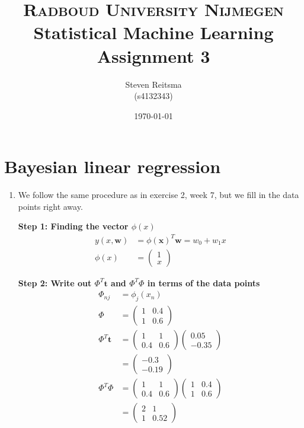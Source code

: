 \documentclass[paper=a4, fontsize=10pt]{scrartcl} %
\title{	
\normalfont \normalsize 
\textsc{Radboud University Nijmegen}  %
\horrule{0.5pt} \\[0.3cm] %
\huge Statistical Machine Learning \\ Assignment 3 \\ %
\horrule{2pt}  %
}
\author{Steven Reitsma \\ (s4132343)} %
\date{\normalsize\today} %
\numberwithin{equation}{section} %
\numberwithin{figure}{section} %
\numberwithin{table}{section} %
\begin{document}
\maketitle %

\section{Bayesian linear regression}
\begin{enumerate}
	\item   We follow the same procedure as in exercise 2, week 7, but we fill in the data points right away.

			\textbf{Step 1: Finding the vector $\phi(x)$}
			\begin{align}
				y(x, \boldsymbol w) &= \phi(\boldsymbol x)^T\boldsymbol w = w_0 + w_1x\\
				\phi(x) &= \begin{pmatrix}
								1\\
								x
							\end{pmatrix}
			\end{align}

			\textbf{Step 2: Write out $\Phi^T\boldsymbol t$ and $\Phi^T\Phi$ in terms of the data points}
			\begin{align}
				\Phi_{nj} &= \phi_j(x_n)\\
				\Phi &= \begin{pmatrix}
							1 & 0.4 \\
							1 & 0.6
						\end{pmatrix}\\
				\Phi^T \boldsymbol t &= \begin{pmatrix}
											1 & 1\\
											0.4 & 0.6
										\end{pmatrix}
										\begin{pmatrix}
											0.05\\
											-0.35
										\end{pmatrix}\\
									&= \begin{pmatrix}
											-0.3\\
											-0.19
										\end{pmatrix}\\
				\Phi^T\Phi &= \begin{pmatrix}
								1 & 1\\
								0.4 & 0.6
							 \end{pmatrix}
							 \begin{pmatrix}
							 	1 & 0.4\\
							 	1 & 0.6
							 \end{pmatrix}\\
							 &= \begin{pmatrix}
							 		2 & 1\\
							 		1 & 0.52
							 	\end{pmatrix}
			\end{align}


\end{enumerate}
\end{document}
